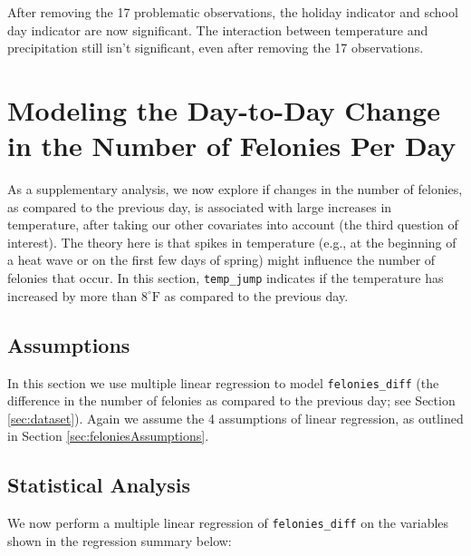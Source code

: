 \documentclass[11pt,notitlepage]{article}
\newcommand{\degf}{^\circ\text{F}}
\begin{document}


After removing the 17 problematic observations, the holiday indicator and school day indicator are now significant. The interaction between temperature and precipitation still isn't significant, even after removing the 17 observations. 






\section{Modeling the Day-to-Day Change in the Number of Felonies Per Day}

As a supplementary analysis, we now explore if changes in the number of felonies, as compared to the previous day, is associated with large increases in temperature, after taking our other covariates into account (the third question of interest). The theory here is that spikes in temperature (e.g., at the beginning of a heat wave or on the first few days of spring) might influence the number of felonies that occur. In this section, \texttt{temp_jump} indicates if the temperature has increased by more than $8\degf$ as compared to the previous day.




\subsection{Assumptions}

In this section we use multiple linear regression to model \texttt{felonies_diff} (the difference in the number of felonies as compared to the previous day; see Section \ref{sec:dataset}). Again we assume the 4 assumptions of linear regression, as outlined in Section \ref{sec:feloniesAssumptions}.

\subsection{Statistical Analysis}

We now perform a multiple linear regression of \texttt{felonies_diff} on the variables shown in the regression summary below:
\end{document}

